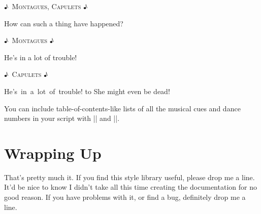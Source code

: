 \documentclass{article}
\def\lyricsymbol{{\textsf ♪}}
\newcommand{\spacer}[1]{
    \setbox\musicalbox\hbox{#1}%
    \noindent\hbox to \wd\musicalbox{\strut\hfil}%
}
\begin{document}
\centerline{\lyricsymbol~\textsc{Montagues, Capulets} \lyricsymbol}
\hspace{4em}How can such a thing have happened?

\medskip\centerline{\lyricsymbol~\textsc{Montagues} \lyricsymbol}
\hspace{4em}\strut He’s in a lot of trouble!

\medskip\centerline{\lyricsymbol~\textsc{Capulets} \lyricsymbol}
\hspace{4em}\strut\spacer{He’s in a lot of trouble!} She might even be dead!

\bigskip

You can include table-of-contents-like lists of all the musical cues and dance numbers in your script with |\listofsongs| and |\listofdances|. 

\section{Wrapping Up}

That's pretty much it. If you find this style library useful, please drop me a line. It'd be nice to know I didn't take all this time creating the documentation for no good reason. If you have problems with it, or find a bug, definitely drop me a line. 
\end{document}
